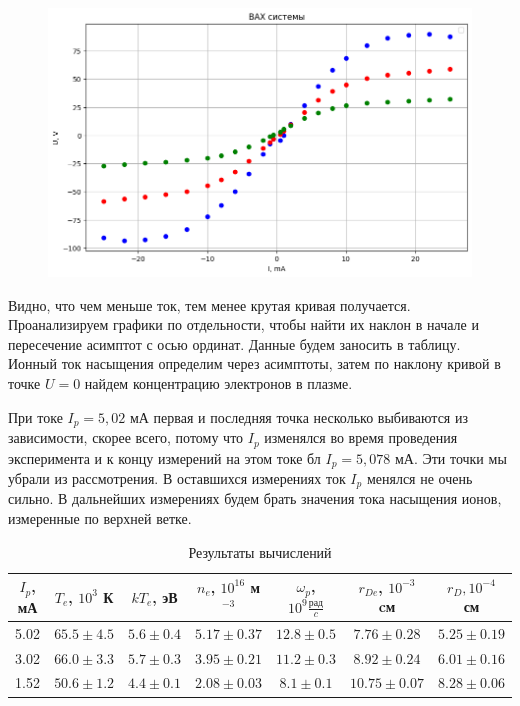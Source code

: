 \documentclass[a4paper, 12pt]{article}
\begin{document}
	\begin{figure}[h!]
		\centering
		\includegraphics[width = \textwidth]{data/data5.png}
	\end{figure}
	
	Видно, что чем меньше ток, тем менее крутая кривая получается. Проанализируем графики по отдельности, чтобы найти их наклон в начале и пересечение асимптот с осью ординат. Данные будем заносить в таблицу. Ионный ток насыщения определим через асимптоты, затем по наклону кривой в точке $U = 0$ найдем концентрацию электронов в плазме.
	
	При токе $I_p = 5,02$ мА первая и последняя точка несколько выбиваются из зависимости, скорее всего, потому что $I_p$ изменялся во время проведения эксперимента и к концу измерений на этом токе бл $I_p = 5,078$ мА. Эти точки мы убрали из рассмотрения. В оставшихся измерениях ток $I_p$ менялся не очень сильно. В дальнейших измерениях будем брать значения тока насыщения ионов, измеренные по верхней ветке.
	
	\begin{table}[h!]
		\centering
		\begin{tabular}{|c|c|c|c|c|c|c|}
			\hline
			$I_p$, мА  & $T_e$, $10^3$ К & $kT_e$, эВ & $n_e$, $10^{16}$ м$^{-3}$ & $\omega_p$, $10^9 \frac{\text{рад}}{c}$ & $r_{De}$, $10^{-3}$ cм & $r_D, 10^{-4}$ см  \\ \hline
			5.02   & $65.5\pm 4.5$ & $5.6 \pm 0.4$ & $5.17 \pm 0.37$                     & $12.8\pm 0.5$                   & $7.76\pm 0.28$    &   $5.25 \pm 0.19$            \\ \hline
			3.02   & $66.0\pm 3.3$ & $5.7 \pm 0.3$ &$3.95\pm 0.21$                     & $11.2\pm 0.3$                    & $8.92\pm 0.24$    &  $6.01 \pm 0.16$               \\ \hline
			1.52   & $50.6	\pm 1.2$ &$4.4 \pm 0.1$ &$2.08\pm 0.03$                    & $8.1\pm 0.1$                     & $10.75 \pm 0.07$  &  $8.28 \pm 0.06$                 \\ \hline
		\end{tabular}
		\caption{Результаты вычислений}
	\end{table}
	
\end{document}
